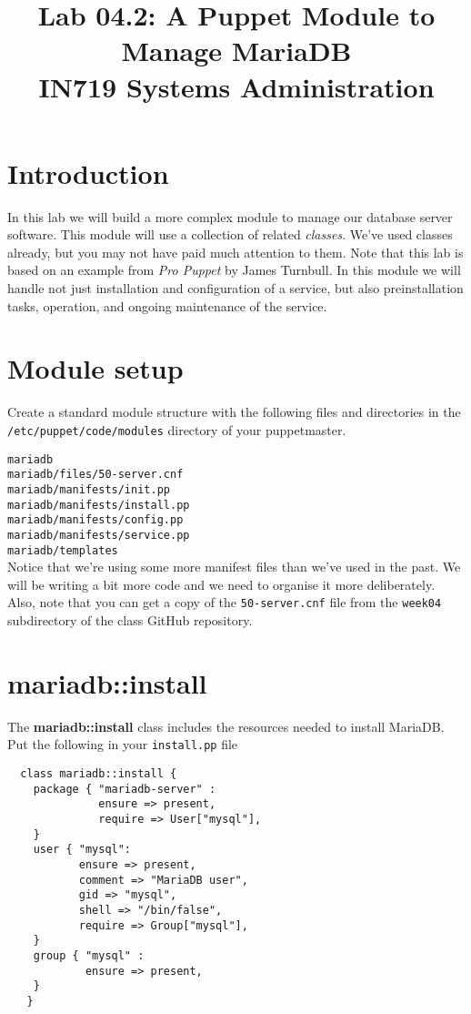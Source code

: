 \documentclass{article}   	%
\title{Lab 04.2: A Puppet Module to Manage MariaDB \\ IN719 Systems Administration}
\date{}							%
\begin{document}
\maketitle

\section*{Introduction}
In this lab we will build a more complex module to manage our database server software.  This module will use a collection of related \emph{classes}.  We've used classes already, but you may not have paid much attention to them.  Note that this lab is based on an example from \emph{Pro Puppet} by James Turnbull.  In this module we will handle not just installation and configuration of a service, but also preinstallation tasks, operation, and ongoing maintenance of the service.
\section{Module setup}
Create a standard module structure with the following files and directories in the \texttt{/etc/puppet/code/modules} directory of your puppetmaster.

\texttt{mariadb} \\
\texttt{mariadb/files/50-server.cnf} \\
\texttt{mariadb/manifests/init.pp} \\
\texttt{mariadb/manifests/install.pp} \\
\texttt{mariadb/manifests/config.pp} \\
\texttt{mariadb/manifests/service.pp} \\
\texttt{mariadb/templates} \\

Notice that we're using some more manifest files than we've used in the past. We will be writing a bit more code and we need to organise it more deliberately. Also, note that you can get a copy of the \texttt{50-server.cnf} file from the \texttt{week04} subdirectory of the class GitHub repository.

\section{mariadb::install}
The \textbf{mariadb::install} class includes the resources needed to install MariaDB.  Put the following in your \texttt{install.pp} file

\begin{verbatim}
  class mariadb::install {
    package { "mariadb-server" :
              ensure => present,
              require => User["mysql"],
    }
    user { "mysql":
           ensure => present,
           comment => "MariaDB user",
           gid => "mysql",
           shell => "/bin/false",
           require => Group["mysql"],
    }
    group { "mysql" :
            ensure => present,
    }
   }

\end{verbatim}
\end{document}
